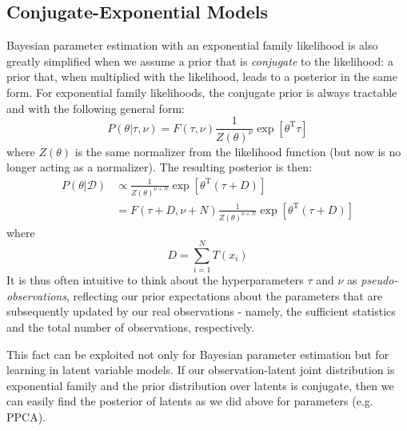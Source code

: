\documentclass[a4paper]{article}
\begin{document}
\subsection{Conjugate-Exponential Models}
Bayesian parameter estimation with an exponential family likelihood is also greatly simplified when we assume a prior that is \emph{conjugate} to the likelihood: a prior that, when multiplied with the likelihood, leads to a posterior in the same form. For exponential family likelihoods, the conjugate prior is always tractable and with the following general form:
\[
P(\theta|\tau,\nu) = F(\tau,\nu)\frac{1}{Z(\theta)^\nu}\exp[\theta^\textrm{T}\tau]
\]
where $Z(\theta)$ is the same normalizer from the likelihood function (but now is no longer acting as a normalizer). The resulting posterior is then:
\begin{align*}
P(\theta|\mathcal{D}) &\propto \frac{1}{Z(\theta)^{\nu + N}} \exp\left[\theta^\textrm{T}\left(\tau + D\right)\right] \\
&= F\left(\tau + D,\nu+N\right) \frac{1}{Z(\theta)^{\nu + N}} \exp\left[\theta^\textrm{T}\left(\tau + D\right)\right]
\end{align*}
where
\[ D = \sum_{i=1}^N T(x_i) \]
It is thus often intuitive to think about the hyperparameters $\tau$ and $\nu$ as \textit{pseudo-observations}, reflecting our prior expectations about the parameters that are subsequently updated by our real observations - namely, the sufficient statistics and the total number of observations, respectively.

This fact can be exploited not only for Bayesian parameter estimation but for learning in latent variable models. If our observation-latent joint distribution is exponential family and the prior distribution over latents is conjugate, then we can easily find the posterior of latents as we did above for parameters (e.g. PPCA).
\end{document}
